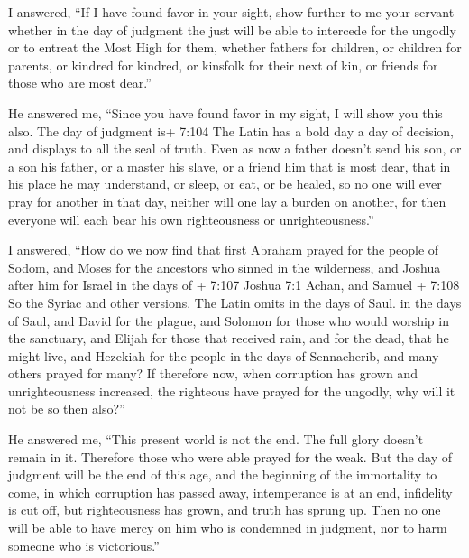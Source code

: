  I answered, ``If I have found favor in your sight, show
further to me your servant whether in the day of judgment the just will
be able to intercede for the ungodly or to entreat the Most High for
them,  whether fathers for children, or children for
parents, or kindred for kindred, or kinsfolk for their next of kin, or
friends for those who are most dear.''

 He answered me, ``Since you have found favor in my sight,
I will show you this also. The day of judgment is+ 7:104 The Latin has a
bold day a day of decision, and displays to all the seal of truth. Even
as now a father doesn't send his son, or a son his father, or a master
his slave, or a friend him that is most dear, that in his place he may
understand, or sleep, or eat, or be healed,  so no one
will ever pray for another in that day, neither will one lay a burden on
another, for then everyone will each bear his own righteousness or
unrighteousness.''

 I answered, ``How do we now find that first Abraham
prayed for the people of Sodom, and Moses for the ancestors who sinned
in the wilderness,  and Joshua after him for Israel in the
days of + 7:107 Joshua 7:1 Achan,  and Samuel + 7:108 So
the Syriac and other versions. The Latin omits in the days of Saul. in
the days of Saul, and David for the plague, and Solomon for those who
would worship in the sanctuary,  and Elijah for those that
received rain, and for the dead, that he might live,  and
Hezekiah for the people in the days of Sennacherib, and many others
prayed for many?  If therefore now, when corruption has
grown and unrighteousness increased, the righteous have prayed for the
ungodly, why will it not be so then also?''

 He answered me, ``This present world is not the end. The
full glory doesn't remain in it. Therefore those who were able prayed
for the weak.  But the day of judgment will be the end of
this age, and the beginning of the immortality to come, in which
corruption has passed away,  intemperance is at an end,
infidelity is cut off, but righteousness has grown, and truth has sprung
up.  Then no one will be able to have mercy on him who is
condemned in judgment, nor to harm someone who is victorious.''

